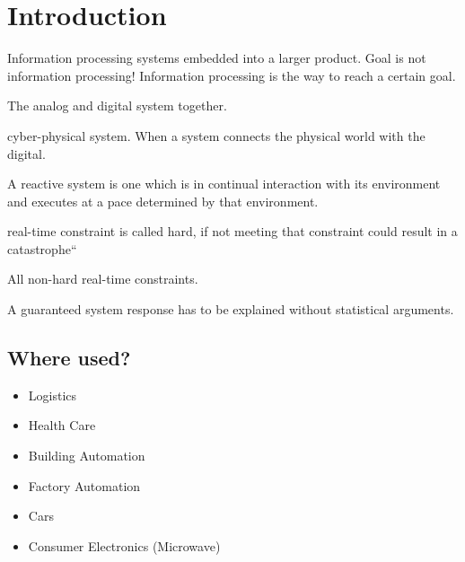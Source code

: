 


\section{Introduction}

\begin{definition}
Information processing systems embedded into a larger product. Goal is not information processing! Information processing is the way to reach a certain goal.
\end{definition}

\begin{definition}
The analog and digital system together.
\end{definition}

\begin{definition}[CPS]
cyber-physical system. When a system connects the physical world with the digital.
\end{definition}

\begin{definition}
A reactive system is one which is in continual interaction 
with its environment and executes at a pace determined by 
that environment.
\end{definition}

\begin{definition}
 real-time constraint is called hard, if not meeting that constraint could result in a catastrophe“
\end{definition}

\begin{definition}
All non-hard real-time constraints.
\end{definition}

\begin{definition}
A guaranteed system response has to be explained without statistical arguments.
\end{definition}

\subsection{Where used?}
\begin{itemize}[noitemsep]
\item Logistics
\item Health Care
\item Building Automation
\item Factory Automation
\item Cars
\item Consumer Electronics (Microwave)
\end{itemize}



